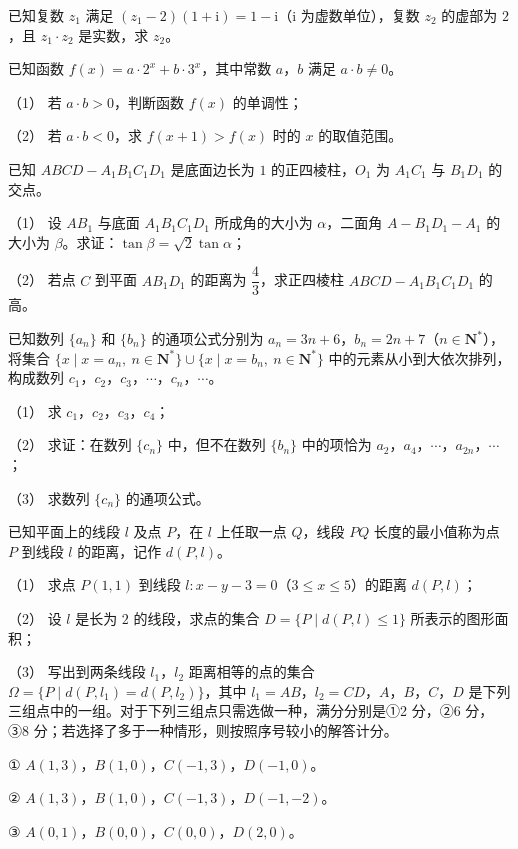 \begin{question}
已知复数 $z_1$ 满足 $(z_1-2)(1+\mathrm i)=1-\mathrm i$（$\mathrm i$ 为虚数单位），复数 $z_2$ 的虚部为 $2$，且 $z_1\cdot z_2$ 是实数，求 $z_2$。

\end{question}
\begin{question}
已知函数 $f(x)=a\cdot2^x+b\cdot3^x$，其中常数 $a$，$b$ 满足 $a\cdot b\neq0$。

（1） 若 $a\cdot b>0$，判断函数 $f(x)$ 的单调性；

（2） 若 $a\cdot b<0$，求 $f(x+1)>f(x)$ 时的 $x$ 的取值范围。

\Needspace{0.4\textheight}
\end{question}
\begin{question}
已知 $ABCD-A_1B_1C_1D_1$ 是底面边长为 $1$ 的正四棱柱，$O_1$ 为 $A_1C_1$ 与 $B_1D_1$ 的交点。

（1） 设 $AB_1$ 与底面 $A_1B_1C_1D_1$ 所成角的大小为 $\alpha$，二面角 $A-B_1D_1-A_1$ 的大小为 $\beta$。求证：$\tan\beta=\sqrt2\tan\alpha$；

（2） 若点 $C$ 到平面 $AB_1D_1$ 的距离为 $\dfrac43$，求正四棱柱 $ABCD-A_1B_1C_1D_1$ 的高。
\nopagebreak[4]
\begin{center}\end{center}
\nopagebreak[4]
\end{question}
\begin{question}
已知数列 $\{a_n\}$ 和 $\{b_n\}$ 的通项公式分别为 $a_n=3n+6$，$b_n=2n+7$（$n\in\mathbf N^*$），将集合 $\{x\mid x=a_n,\ n\in\mathbf N^*\}\cup\{x\mid x=b_n,\ n\in\mathbf N^*\}$ 中的元素从小到大依次排列，构成数列 $c_1$，$c_2$，$c_3$，$\cdots$，$c_n$，$\cdots$。

（1） 求 $c_1$，$c_2$，$c_3$，$c_4$；

（2） 求证：在数列 $\{c_n\}$ 中，但不在数列 $\{b_n\}$ 中的项恰为 $a_2$，$a_4$，$\cdots$，$a_{2n}$，$\cdots$；

（3） 求数列 $\{c_n\}$ 的通项公式。

\end{question}
\begin{question}
已知平面上的线段 $l$ 及点 $P$，在 $l$ 上任取一点 $Q$，线段 $PQ$ 长度的最小值称为点 $P$ 到线段 $l$ 的距离，记作 $d(P,l)$。

（1） 求点 $P(1,1)$ 到线段 $l:x-y-3=0$（$3\leqslant x\leqslant5$）的距离 $d(P,l)$；

（2） 设 $l$ 是长为 $2$ 的线段，求点的集合 $D=\{P\mid d(P,l)\leqslant1\}$ 所表示的图形面积；

（3） 写出到两条线段 $l_1$，$l_2$ 距离相等的点的集合 $\Omega=\{P\mid d(P,l_1)=d(P,l_2)\}$，其中 $l_1=AB$，$l_2=CD$，$A$，$B$，$C$，$D$ 是下列三组点中的一组。对于下列三组点只需选做一种，满分分别是①2 分，②6 分，③8 分；若选择了多于一种情形，则按照序号较小的解答计分。

① $A(1,3)$，$B(1,0)$，$C(-1,3)$，$D(-1,0)$。

② $A(1,3)$，$B(1,0)$，$C(-1,3)$，$D(-1,-2)$。

③ $A(0,1)$，$B(0,0)$，$C(0,0)$，$D(2,0)$。

\clearpage

\end{question}